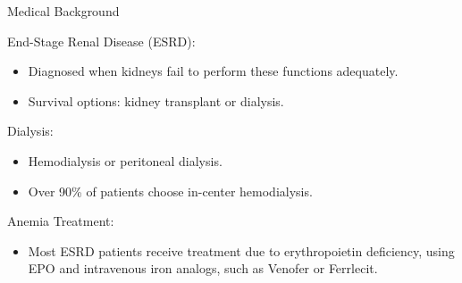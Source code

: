 \begin{frame}{Medical Background}
    
End-Stage Renal Disease (ESRD):
    \begin{itemize}
        \item Diagnosed when kidneys fail to perform these functions adequately.
        \item Survival options: kidney transplant or dialysis.
    \end{itemize}
    
Dialysis:
    \begin{itemize}
        \item Hemodialysis or peritoneal dialysis.
        \item Over 90\% of patients choose in-center hemodialysis.
    \end{itemize}

Anemia Treatment:
    \begin{itemize}
        \item Most ESRD patients receive treatment due to erythropoietin deficiency, using EPO and intravenous iron analogs, such as Venofer or Ferrlecit.
    \end{itemize}

\end{frame}
